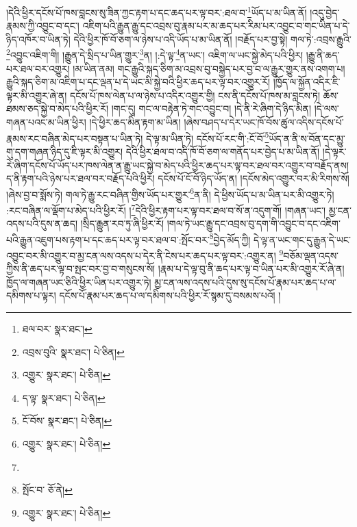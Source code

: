 །དེའི་ཕྱིར་དངོས་པོ་ཁས་བླངས་སུ་ཟིན་ཀྱང་རྟག་པ་དང་ཆད་པར་ལྟ་བར་:ཐལ་བ་\footnote{ཐལ་བར་  སྣར་ཐང་། }ཡོད་པ་མ་ཡིན་ནོ། །འདུ་བྱེད་རྣམས་ཀྱི་འབྱུང་བ་དང་། འཇིག་པའི་རྒྱུན་རྒྱུ་དང་འབྲས་བུ་རྣམ་པར་མ་ཆད་པར་རིམ་པར་འབྱུང་བ་གང་ཡིན་པ་དེ་ཉིད་འཁོར་བ་ཡིན་ཏེ། དེའི་ཕྱིར་ཁོ་བོ་ཅག་ལ་ཉེས་པ་འདི་ཡོད་པ་མ་ཡིན་ནོ། །བརྗོད་པར་བྱ་སྟེ། གལ་ཏེ་:འབྲས་རྒྱུའི་\footnote{འབྲས་བུའི་  སྣར་ཐང་།  པེ་ཅིན། }འབྱུང་འཇིག་གི། །རྒྱུན་དེ་སྲིད་པ་ཡིན་གྱུར་\footnote{འགྱུར་  སྣར་ཐང་།  པེ་ཅིན། }ན། །:དེ་ལྟ་\footnote{ད་ལྟ་  སྣར་ཐང་།  པེ་ཅིན། }ན་ཡང་། འཇིག་ལ་ཡང་སྐྱེ་མེད་པའི་ཕྱིར། །རྒྱུ་ནི་ཆད་པར་ཐལ་བར་འགྱུར། །མ་ཡིན་ནམ། གང་རྒྱུའི་སྐད་ཅིག་མ་འབྲས་བུ་བསྐྱེད་པར་བྱ་བ་ལ་རྒྱུར་གྱུར་ནས་འགག་པ། རྒྱུའི་སྐད་ཅིག་མ་འཇིག་པ་དང་ལྡན་པ་དེ་ཡང་མི་སྐྱེ་བའི་ཕྱིར་ཆད་པར་ལྟ་བར་འགྱུར་རོ། །ཁྱོད་ལ་སྐྱོན་འདིར་ཇི་ལྟར་མི་འགྱུར་ཞེ་ན། དངོས་པོ་ཁས་ལེན་པ་ལ་ཉེས་པ་འདིར་འགྱུར་གྱི། ངས་ནི་དངོས་པོ་ཁས་མ་བླངས་ཏེ། ཆོས་ཐམས་ཅད་སྐྱེ་བ་མེད་པའི་ཕྱིར་རོ། །གང་དུ། གང་ལ་བརྟེན་ཏེ་གང་འབྱུང་བ། །དེ་ནི་རེ་ཞིག་དེ་ཉིད་མིན། །དེ་ལས་གཞན་པའང་མ་ཡིན་ཕྱིར། །དེ་ཕྱིར་ཆད་མིན་རྟག་མ་ཡིན། །ཞེས་བཤད་པ་དེར་ཡང་ཁོ་བོས་ཚུལ་འདིས་དངོས་པོ་རྣམས་རང་བཞིན་མེད་པར་བསྟན་པ་ཡིན་ཏེ། དེ་ལྟ་མ་ཡིན་ཏེ། དངོས་པོ་རང་གི་:ངོ་བོ་\footnote{ངོ་བོས་  སྣར་ཐང་།  པེ་ཅིན། }ཡོད་ན་ནི་ས་བོན་དང་མྱུ་གུ་དག་གཞན་ཉིད་དུ་ཇི་ལྟར་མི་འགྱུར། དེའི་ཕྱིར་ཐལ་བ་འདི་ཁོ་བོ་ཅག་ལ་གནོད་པར་བྱེད་པ་མ་ཡིན་ནོ། །དེ་ལྟར་རེ་ཞིག་དངོས་པོ་ཡོད་པར་ཁས་ལེན་ན་རྒྱུ་ཡང་སྐྱེ་བ་མེད་པའི་ཕྱིར་ཆད་པར་ལྟ་བར་ཐལ་བར་འགྱུར་བ་བརྗོད་ནས། ད་ནི་རྟག་པའི་ཉེས་པར་ཐལ་བར་བརྗོད་པའི་ཕྱིར། དངོས་པོ་ངོ་བོ་ཉིད་ཡོད་ན། །དངོས་མེད་འགྱུར་བར་མི་རིགས་སོ། །ཞེས་བྱ་བ་སྨོས་ཏེ། གལ་ཏེ་རྒྱུ་རང་བཞིན་གྱིས་ཡོད་པར་གྱུར་\footnote{འགྱུར་  སྣར་ཐང་།  པེ་ཅིན། }ན་ནི། དེ་ཕྱིས་ཡོད་པ་མ་ཡིན་པར་མི་འགྱུར་ཏེ། :རང་བཞིན་ལ་ལྡོག་པ་མེད་པའི་ཕྱིར་རོ། །\footnote{}དེའི་ཕྱིར་རྟག་པར་ལྟ་བར་ཐལ་བ་སོ་ན་འདུག་གོ། །གཞན་ཡང་། མྱ་ངན་འདས་པའི་དུས་ན་ཆད། །སྲིད་རྒྱུན་རབ་ཏུ་ཞི་ཕྱིར་རོ། །གལ་ཏེ་ཡང་རྒྱུ་དང་འབྲས་བུ་དག་གི་འབྱུང་བ་དང་འཇིག་པའི་རྒྱུན་འཇུག་པས་རྟག་པ་དང་ཆད་པར་ལྟ་བར་ཐལ་བ་:སྤོང་བར་\footnote{སྤོང་བ་  ཅོ་ནེ། }བྱེད་མོད་ཀྱི། དེ་ལྟ་ན་ཡང་གང་དུ་རྒྱུན་དེ་ཡང་འབྱུང་བར་མི་འགྱུར་བ་མྱ་ངན་ལས་འདས་པ་དེར་ནི་ངེས་པར་ཆད་པར་ལྟ་བར་:འགྱུར་ན། \footnote{འགྱུར་  སྣར་ཐང་།  པེ་ཅིན། }བཅོམ་ལྡན་འདས་ཀྱིས་ནི་ཆད་པར་ལྟ་བ་སྤང་བར་བྱ་བ་གསུངས་སོ། །རྣམ་པ་དེ་ལྟ་བུ་ནི་ཆད་པར་ལྟ་བ་ཡིན་པར་མི་འགྱུར་རོ་ཞེ་ན། ཁྱོད་ལ་གཞན་ཡང་ཅིའི་ཕྱིར་ཡིན་པར་འགྱུར་ཏེ། མྱ་ངན་ལས་འདས་པའི་དུས་སུ་དངོས་པོ་རྣམ་པར་ཆད་པ་ལ་དམིགས་པ་ལྟར། དངོས་པོ་རྣམ་པར་ཆད་པ་ལ་དམིགས་པའི་ཕྱིར་རོ་སྙམ་དུ་བསམས་པའོ། །
